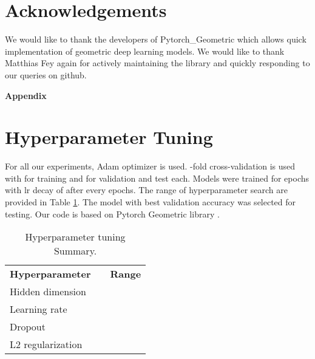 \documentclass[letterpaper]{article} \usepackage{aaai20}  \usepackage{times}  \usepackage{helvet} \usepackage{courier}  \usepackage[hyphens]{url}  \usepackage{graphicx} \urlstyle{rm} \def\UrlFont{\rm}  \usepackage{graphicx}  \frenchspacing  \setlength{\pdfpagewidth}{8.5in}  \setlength{\pdfpageheight}{11in}
\begin{document}
%
 
\section{Acknowledgements}
We would like to thank the developers of Pytorch\_Geometric \cite{bhai} which allows quick implementation of geometric deep learning models. We would like to thank Matthias Fey again for actively maintaining the library and quickly responding to our queries on github.



{\fontsize{9.0pt}{10.0pt} \selectfont }



\appendix


\setcounter{secnumdepth}{1}
	
\vspace{1cm}
	{\hspace{2.7cm} \textbf{\LARGE Appendix}}
	
	
	\section{Hyperparameter Tuning}
	\label{ssec:hyper-tune}
	For all our experiments, Adam \cite{adam} optimizer is used. -fold cross-validation is used with  for training and  for validation and test each. Models were trained for  epochs with lr decay of  after every  epochs. The range of hyperparameter search are provided in Table \ref{tab:hyper-tune}. The model with best validation accuracy was selected for testing. Our code is based on Pytorch Geometric library \cite{bhai}.
	
	
	\begin{table}[tbh!]
		\begin{center}
			\begin{small}
\begin{tabular}{lcl}
					\toprule
					\textbf{Hyperparameter} & & \textbf{Range} \\
					\cmidrule{1-3}
Hidden dimension & &  \\
					Learning rate & &  \\
					Dropout & & \\
					L2 regularization & &  \\
					\bottomrule
				\end{tabular}
				\caption{\label{tab:hyper-tune} Hyperparameter tuning Summary.}
			\end{small}
		\end{center}
	\end{table}
	
\end{document}
